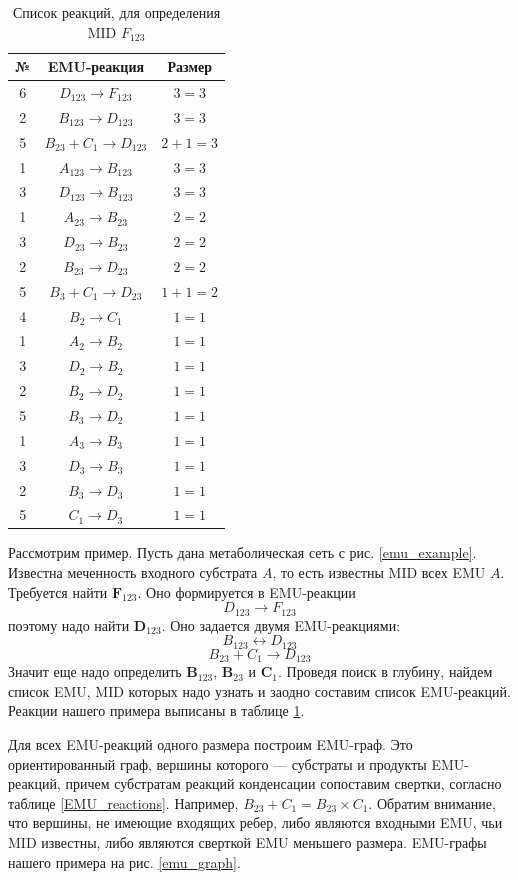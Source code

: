 \documentclass[14pt, a4paper]{extreport}
\begin{document}
\clearpage
\begin{table}
	\begin{tabular}{c c c}
		\hline
		№ & EMU-реакция & Размер\\
		\hline
		6 & $D_{123} \to F_{123}$ & $3 = 3$\\
		2 & $B_{123} \to D_{123}$ & $3 = 3$\\
		5 & $B_{23} + C_1 \to D_{123}$ & $2 + 1 = 3$\\
		1 & $A_{123} \to B_{123}$ & $3 = 3$\\
		3 & $D_{123} \to B_{123}$ & $3 = 3$\\
		1 & $A_{23} \to B_{23}$ & $2 = 2$\\
		3 & $D_{23} \to B_{23}$ & $2 = 2$\\
		2 & $B_{23} \to D_{23}$ & $2 = 2$\\
		5 & $B_3 + C_1 \to D_{23}$ & $1 + 1 = 2$\\
		4 & $B_2 \to C_1$ & $1 = 1$\\
		1 & $A_2 \to B_2$ & $1 = 1$\\
		3 & $D_2 \to B_2$ & $1 = 1$\\
		2 & $B_2 \to D_2$ & $1 = 1$\\
		5 & $B_3 \to D_2$ & $1 = 1$\\
		1 & $A_3 \to B_3$ & $1 = 1$\\
		3 & $D_3 \to B_3$ & $1 = 1$\\
		2 & $B_3 \to D_3$ & $1 = 1$\\
		5 & $C_1 \to D_3$ & $1 = 1$\\
	\end{tabular}
	\caption{Список реакций, для определения MID $F_{123}$}
	\label{all_emu_reactions}
\end{table}


Рассмотрим пример. Пусть дана метаболическая сеть с рис. \ref{emu_example}. Известна меченность входного субстрата $A$, то есть известны MID всех EMU $A$. Требуется найти $\mathbf{F}_{123}$. Оно формируется в EMU-реакции $$D_{123} \to F_{123}$$ поэтому надо найти $\mathbf{D}_{123}$. Оно задается двумя EMU-реакциями: $$B_{123} \leftrightarrow D_{123}$$ $$B_{23} + C_1 \to D_{123}$$Значит еще надо определить $\mathbf{B}_{123}$, $\mathbf{B}_{23}$ и $\mathbf{C}_1$. Проведя поиск в глубину, найдем список EMU, MID которых надо узнать и заодно составим список EMU-реакций. Реакции нашего примера выписаны в таблице \ref{all_emu_reactions}.

Для всех EMU-реакций одного размера построим EMU-граф. Это ориентированный граф, вершины которого --- субстраты и продукты EMU-реакций, причем субстратам реакций конденсации сопоставим свертки, согласно таблице \ref{EMU_reactions}. Например, $B_{23} + C_1 = B_{23} \times C_1$. Обратим внимание, что вершины, не имеющие входящих ребер, либо являются входными EMU, чьи MID известны, либо являются сверткой EMU меньшего размера. EMU-графы нашего примера на рис. \ref{emu_graph}.
\end{document}
